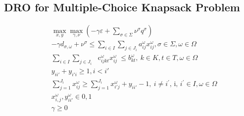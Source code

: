 \subsection{DRO for Multiple-Choice Knapsack Problem}
\label{DRO_MCKP}

\vst {}
\begin{subequations}\label{DROMCKP}
\begin{eqnarray}
& & \max_{x, y} \max_{\gamma, \nu} (-\gamma \varepsilon + \sum_{\sigma \in \Sigma} \nu^\sigma q^\sigma)  \\
& &  -\gamma d_{\sigma, \omega} + \nu^\sigma \le \sum _{i \in I}^{} \sum _{j \in J_{i}}^{}a_{ij}^{ \omega }x_{ij}^{ \omega }, \sigma \in \Sigma, \omega \in \Omega \\
& & \sum _{i \in I}^{} \sum _{j \in J_{i}}^{}\text{~ c}_{ijkt}^{ \omega }x_{ij}^{ \omega }~  \leq  b_{kt}^{ \omega },~ k \in K, t \in T,  \omega  \in  \Omega \\
& & y_{ii'} + y_{i'i} \geq 1, i<i'  \\
& & \sum_{j=1}^{J_i} x_{ij}^\omega \geq \sum_{j=1}^{J_i} x_{i'j}^\omega + y_{ii'} -1,~ i \neq i^{'}\text{, i, }i^{'} \in I,  \omega  \in  \Omega \\
& & x_{i,j}^\omega, y_{ii'}^\omega \in {0, 1} \\
& & \gamma \ge 0
\end{eqnarray}
\end{subequations}

